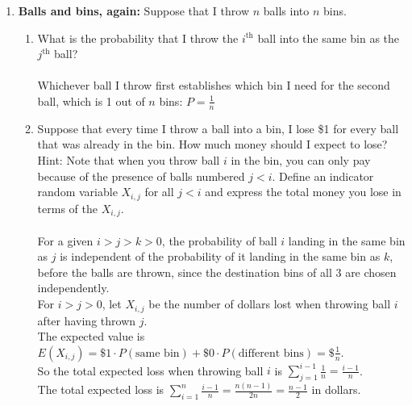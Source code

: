\documentclass[11pt,fleqn]{article}
\begin{document}
\begin{enumerate}

\item \textbf{Balls and bins, again:}
Suppose that I throw $n$ balls into $n$ bins.
\begin{enumerate}
\item What is the probability that I throw the $i^{\text{th}}$
ball into the same bin as the $j^{\text{th}}$ ball? \\\\
Whichever ball I throw first establishes which bin I need for the second ball, which is 1 out of $n$ bins: $P = \frac1n$ \\
\item Suppose that every time I throw a ball into a bin,
I lose \$1 for every ball that was already in the bin.
How much money should I expect to lose?\\
Hint: Note that when you throw ball $i$ in the bin, you can only pay because of the presence of balls numbered $j < i$. 
Define an indicator random variable $X_{i,j}$ for all $j < i$ and express the total money you lose in terms of the $X_{i,j}$. \\\\
For a given $i > j > k > 0$, the probability of ball $i$ landing in the same bin as $j$ is independent of the probability of it landing in the same bin as $k$, before the balls are thrown, since the destination bins of all 3 are chosen independently. \\
For $i > j > 0$, let $X_{i,j}$ be the number of dollars lost when throwing ball $i$ after having thrown $j$. \\
The expected value is $E(X_{i,j}) = \$1\cdot P(\text{same bin}) + \$0\cdot P(\text{different bins}) = \$\frac1n$. \\
So the total expected loss when throwing ball $i$ is $\displaystyle\sum\limits_{j=1}^{i-1} \frac1n = \frac{i-1}n$. \\
The total expected loss is $\displaystyle\sum\limits_{i=1}^{n} \frac{i-1}n = \frac{n(n-1)}{2n} = \frac{n-1}2$ in dollars.
\end{enumerate}


\end{enumerate}
\end{document}
